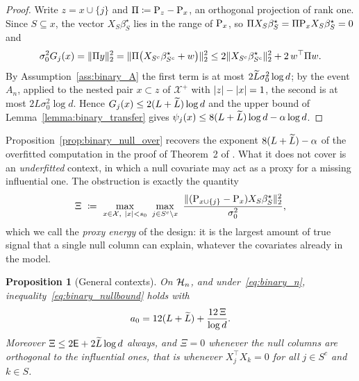 \documentclass[aos]{imsart}%
\DeclarePairedDelimiter{\norm}{\lVert}{\rVert}
\DeclarePairedDelimiter{\abs}{\lvert}{\rvert}
\newcommand{\ambientspace}[0]{\mathcal{X}}
\theoremstyle{plain}
\newtheorem{proposition}{Proposition}[section]
\theoremstyle{definition}
\begin{document}
    \begin{proof}
        Write $z=x\cup\{j\}$ and $\Pi\coloneq\mathrm{P}_z-\mathrm{P}_x$, an orthogonal
        projection of rank one. Since $S\subseteq x$, the vector
        $X_S\beta^\star_S$ lies in the range of $\mathrm{P}_x$, so
        $\Pi X_S\beta^\star_S=\Pi\mathrm{P}_xX_S\beta^\star_S=0$ and
        \begin{equation*}
            \sigma_0^{2}G_j(x)=\norm{\Pi y}_2^{2}
            =\norm{\Pi\bigl(X_{S^{c}}\beta^\star_{S^{c}}+w\bigr)}_2^{2}
            \leq2\norm{X_{S^{c}}\beta^\star_{S^{c}}}_2^{2}+2\,w^{\top}\Pi w .
        \end{equation*}
        By Assumption~\ref{ass:binary_A} the first term is at most
        $2\widetilde{L}\sigma_0^{2}\log d$; by the event $A_n$, applied to the nested
        pair $x\subset z$ of $\ambientspace^{+}$ with
        $\abs z-\abs x=1$, the second is at most $2L\sigma_0^{2}\log d$. Hence
        $G_j(x)\leq2(L+\widetilde{L})\log d$ and the upper bound of
        Lemma~\ref{lemma:binary_transfer} gives
        $\psi_j(x)\leq8(L+\widetilde{L})\log d-\alpha\log d$.
    \end{proof}

    Proposition~\ref{prop:binary_null_over} recovers the exponent
    $8(L+\widetilde{L})-\alpha$ of the overfitted computation in the proof of Theorem~2
    of \citet{YangWainwrightJordan2016}. What it does not cover is an
    \emph{underfitted} context, in which a null covariate may act as a proxy
    for a missing influential one. The obstruction is exactly the quantity
    \begin{equation}
        \label{eq:binary_proxy}
        \Xi\ \coloneq\ \max_{\substack{x\in\ambientspace,\ \abs x<s_0}}\
        \max_{j\in S^{c}\setminus x}\
        \frac{\norm{(\Proj_{x\cup\{j\}}-\Proj_x)X_S\beta^\star_S}_2^{2}}
        {\sigma_0^{2}},
    \end{equation}
    which we call the \emph{proxy energy} of the design: it is the largest
    amount of true signal that a single null column can explain, whatever the
    covariates already in the model.

    \begin{proposition}[General contexts]
        \label{prop:binary_null_gen}
        On $\mathcal{H}_n$, and under~\eqref{eq:binary_n},
        inequality~\eqref{eq:binary_nullbound} holds with
        \begin{equation*}
            a_0=12(L+\widetilde{L})+\frac{12\,\Xi}{\log d} .
        \end{equation*}
        Moreover $\Xi\leq2\mathsf{E}+2\widetilde{L}\log d$ always, and $\Xi=0$ whenever
        the null columns are orthogonal to the influential ones, that is
        whenever $X_j^{\top}X_k=0$ for all $j\in S^{c}$ and $k\in S$.
    \end{proposition}
\end{document}
